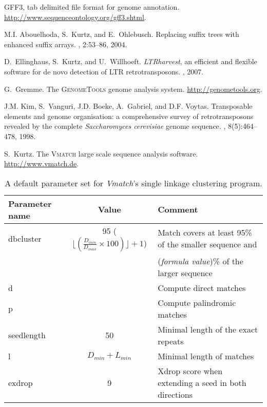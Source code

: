 \documentclass[12pt,titlepage]{article}
\begin{document}
%
%
\begin{thebibliography}{1}

\textsc{GFF3}, tab delimited file format for genome annotation.
  \url{http://www.sequenceontology.org/gff3.shtml}.

M.I. Abouelhoda, S.~Kurtz, and E.~Ohlebusch.
\newblock Replacing suffix trees with enhanced suffix arrays.
, 2:53--86, 2004.

D.~Ellinghaus, S.~Kurtz, and U.~Willhoeft.
\newblock \textit{LTRharvest}, an efficient and flexible software for de novo
  detection of \normalsize{LTR} retrotransposons.
, 2007.

G.~Gremme.
\newblock The \textsc{GenomeTools} genome analysis system.
  \url{http://genometools.org}.

J.M. Kim, S.~Vanguri, J.D. Boeke, A.~Gabriel, and D.F. Voytas.
\newblock Transposable elements and genome organisation: a comprehensive survey
  of retrotransposons revealed by the complete \textit{Saccharomyces
  cerevisiae} genome sequence.
, 8(5):464--478, 1998.

S.~Kurtz.
\newblock The \textsc{Vmatch} large scale sequence analysis software.
  \url{http://www.vmatch.de}.

\end{thebibliography}

\begin{table}
\caption{A default parameter set for \textit{Vmatch}'s single linkage 
  clustering program.}
\vspace{0.25cm}
\begin{tabular}[h!]{lcl}\hline
Parameter name & Value & Comment\\\hline
dbcluster    & 95 ($\lfloor(\frac{D_{min}}{D_{max}} \times 100)\rfloor + 1$) & Match covers at least 95\% of the smaller sequence and\\
             &                                                 & (\textit{formula value})\% of the larger sequence\\
d  & & Compute direct matches\\
p & & Compute palindromic matches\\
seedlength & 50 & Minimal length of the exact repeats\\
l & $D_{min} + L_{min}$ & Minimal length of matches\\
exdrop & 9 & Xdrop score when extending a seed in both directions\\\hline
\end{tabular}
\label{parameters-cluster-default}
\end{table}
\end{document}
